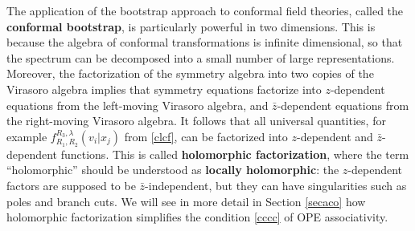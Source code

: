 \documentclass[12pt,a4paper,notitlepage]{report}
\numberwithin{equation}{section}
\theoremstyle{break}
\begin{document}
The application of the bootstrap approach to conformal field theories, called the \textbf{conformal bootstrap}, 
is particularly powerful in two dimensions.
This is because the algebra of conformal transformations is infinite dimensional, 
so that the spectrum can be decomposed into a small number of large representations.
Moreover, the factorization of the symmetry algebra into two copies of the Virasoro algebra 
implies that symmetry equations factorize into $z$-dependent equations from the left-moving Virasoro algebra, and $\bar{z}$-dependent equations from the right-moving Virasoro algebra.
It follows that all universal quantities, for example $f_{R_1,R_2}^{R_3,\lambda}(v_i|x_j)$ from \eqref{clcf}, can be factorized into $z$-dependent and $\bar{z}$-dependent functions. 
This is called \textbf{\boldmath holomorphic factorization}, where the term ``holomorphic''
should be understood as \textbf{\boldmath locally holomorphic}: the $z$-dependent factors are supposed to be $\bar{z}$-independent, but they can have singularities such as poles and branch cuts.
We will see in more detail in Section \ref{secaco} how holomorphic factorization simplifies the condition \eqref{cccc} of OPE associativity.
\end{document}
